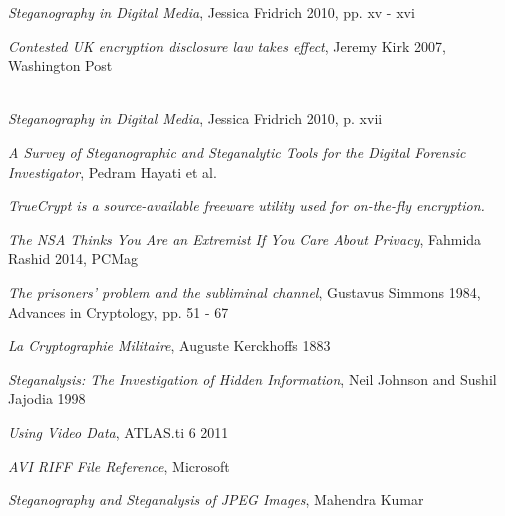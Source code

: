 \documentclass[paper=a4, fontsize=11pt,twoside]{scrartcl}
\numberwithin{table}{section}
\numberwithin{figure}{section}
\numberwithin{algorithm}{section}
\begin{document}
\begin{thebibliography}{1}

 \emph{Steganography in Digital Media}, Jessica Fridrich 2010, pp. xv - xvi

 \emph{Contested UK encryption disclosure law takes effect}, Jeremy Kirk 2007, Washington Post\\ 
\\

 \emph{Steganography in Digital Media}, Jessica Fridrich 2010, p. xvii

 \emph{A Survey of Steganographic and Steganalytic Tools for the Digital Forensic Investigator}, Pedram Hayati et al.\\

 \emph{TrueCrypt is a source-available freeware utility used for on-the-fly encryption.}\\

 \emph{The NSA Thinks You Are an Extremist If You Care About Privacy}, Fahmida Rashid 2014, PCMag\\

 \emph{The prisoners' problem and the subliminal channel}, Gustavus Simmons 1984, Advances in Cryptology, pp. 51 - 67

 \emph{La Cryptographie Militaire}, Auguste Kerckhoffs 1883

 \emph{Steganalysis: The Investigation of Hidden Information}, Neil Johnson and Sushil Jajodia 1998 

 \emph{Using Video Data}, ATLAS.ti 6 2011\\

 \emph{AVI RIFF File Reference}, Microsoft\\

 \emph{Steganography and Steganalysis of JPEG Images}, Mahendra Kumar\\


\end{thebibliography}
\end{document}
